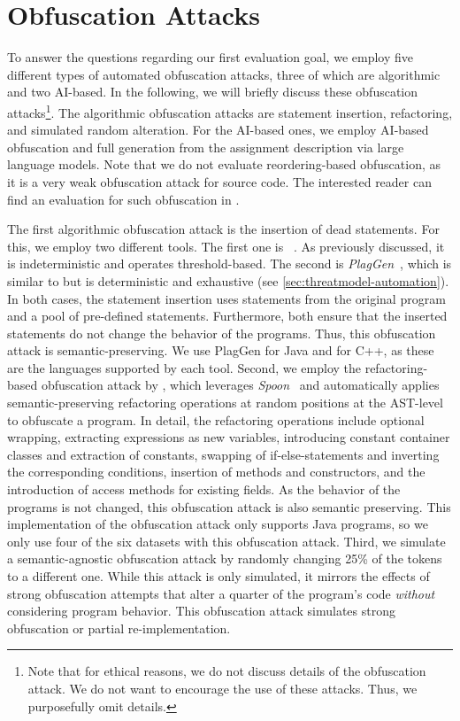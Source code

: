 
\section{Obfuscation Attacks}
To answer the questions regarding our first evaluation goal, we employ five different types of automated obfuscation attacks, three of which are algorithmic and two AI-based.
In the following, we will briefly discuss these obfuscation attacks\footnote{Note that for ethical reasons, we do not discuss details of the obfuscation attack. We do not want to encourage the use of these attacks. Thus, we purposefully omit details.}.
The algorithmic obfuscation attacks are statement insertion, refactoring, and simulated random alteration.
For the AI-based ones, we employ AI-based obfuscation and full generation from the assignment description via large language models.
Note that we do not evaluate reordering-based obfuscation, as it is a very weak obfuscation attack for source code.
The interested reader can find an evaluation for such obfuscation in .
 
The first algorithmic obfuscation attack is the insertion of dead statements.
For this, we employ two different tools. The first one is \mossad~\cite{DevoreMcDonald2020}. As previously discussed, it is indeterministic and operates threshold-based. The second is \textit{PlagGen}~\cite{Broedel2023}, which is similar to \mossad but is deterministic and exhaustive (see \autoref{sec:threatmodel-automation}). In both cases, the statement insertion uses statements from the original program and a pool of pre-defined statements. Furthermore, both ensure that the inserted statements do not change the behavior of the programs. Thus, this obfuscation attack is semantic-preserving. We use PlagGen for Java and \mossad for C++, as these are the languages supported by each tool.
%
Second, we employ the refactoring-based obfuscation attack by \citet{Maisch2024}, which leverages \textit{Spoon}~\cite{Pawlak2006} and automatically applies semantic-preserving refactoring operations at random positions at the AST-level to obfuscate a program.
In detail, the refactoring operations include optional wrapping, extracting expressions as new variables, introducing constant container classes and extraction of constants, swapping of if-else-statements and inverting the corresponding conditions, insertion of methods and constructors, and the introduction of access methods for existing fields.
As the behavior of the programs is not changed, this obfuscation attack is also semantic preserving.
This implementation of the obfuscation attack only supports Java programs, so we only use four of the six datasets with this obfuscation attack.
%
Third, we simulate a semantic-agnostic obfuscation attack by randomly changing 25\% of the tokens to a different one. While this attack is only simulated, it mirrors the effects of strong obfuscation attempts that alter a quarter of the program's code \textit{without} considering program behavior. This obfuscation attack simulates strong obfuscation or partial re-implementation.

